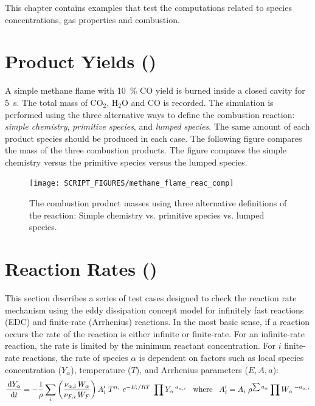 \documentclass[11pt]{book}
\begin{document}
This chapter contains examples that test the computations related to species concentrations, gas properties and combustion.



\section{Product Yields (\texorpdfstring{}{methane\_flame})}
\label{methane_flame}

A simple methane flame with 10~\% CO yield is burned inside a closed cavity for 5~s.
The total mass of CO$_2$, H$_2$O and CO is recorded.
The simulation is performed using the three alternative ways
to define the combustion reaction: {\em simple chemistry}, {\em primitive species}, and {\em lumped species}. The
same amount of each product species should be produced in each case. The following figure compares the
mass of the three combustion products. The figure compares the simple chemistry versus the primitive species versus the lumped species.
\begin{figure}[ht]
\centering
\texttt{[image: SCRIPT\_FIGURES/methane\_flame\_reac\_comp]}
\caption[Yield of combustion products for alternative reactions]{The combustion product masses using three alternative definitions of the reaction:  Simple chemistry vs. primitive species vs. lumped species. }
\label{fig_methane_flame_yields}
\end{figure}

\clearpage

\section{Reaction Rates (\texorpdfstring{}{reactionrate})}

This section describes a series of test cases designed to check the reaction rate mechanism using the eddy dissipation concept model for infinitely fast reactions (EDC) and  finite-rate (Arrhenius) reactions. In the most basic sense, if a reaction occurs the rate of the reaction is either infinite or finite-rate. For an infinite-rate reaction, the rate is limited by the minimum reactant concentration. For $i$ finite-rate reactions, the rate of species $\alpha$ is dependent on factors such as local species concentration ($Y_{\alpha}$), temperature ($T$), and Arrhenius parameters ($E,A,a$):
\begin{equation}\label{eq:finite_rate1}
\frac{\,\mathrm{d} Y_{\alpha}}{\,\mathrm{d} t} = -\frac{1}{\rho}\sum_{i} \left(\frac{\nu_{\alpha,i}\,W_{\alpha}}{\nu_{F,i}\,W_{F}}\right)A_i^{\prime}\;T^{n_i}\;e^{-E_i/RT}\;\prod Y_{\alpha}\,^{a_{\alpha,i}} \;\;\; \text{where} \;\;\; A^{\prime}_{i} = A_{i}\;\rho^{\sum a_{\alpha}}\prod W_{\alpha}\,^{-a_{\alpha,i}}
\end{equation}
\end{document}
